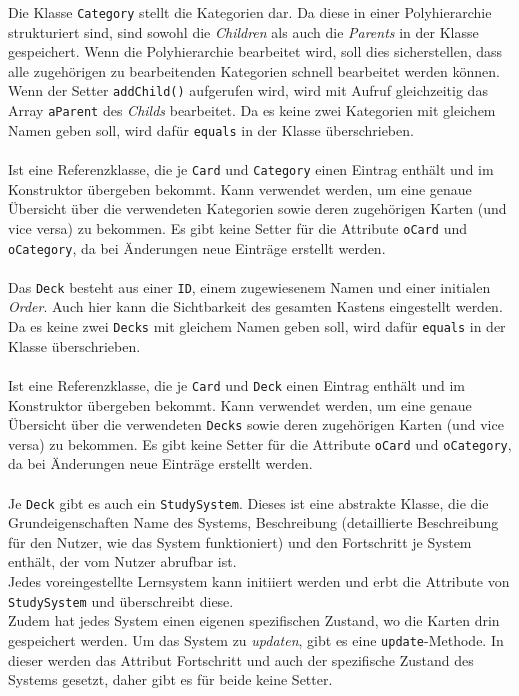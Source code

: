 \documentclass[fontsize=12pt,paper=a4,twoside]{scrartcl}
\begin{document}
\newpage
{}
Die Klasse \texttt{Category} stellt die Kategorien dar. Da diese in einer Polyhierarchie strukturiert sind, sind sowohl die \textit{Children} als auch die \textit{Parents} in der Klasse gespeichert. Wenn die Polyhierarchie bearbeitet wird, soll dies sicherstellen, dass alle zugehörigen zu bearbeitenden Kategorien schnell bearbeitet werden können. Wenn der Setter \texttt{addChild()} aufgerufen wird, wird mit Aufruf gleichzeitig das Array \texttt{aParent} des \textit{Childs} bearbeitet. Da es keine zwei Kategorien mit gleichem Namen geben soll, wird dafür \texttt{equals} in der Klasse überschrieben.\\
\\

Ist eine Referenzklasse, die je \texttt{Card} und \texttt{Category} einen Eintrag enthält und im Konstruktor übergeben bekommt. Kann verwendet werden, um eine genaue Übersicht über die verwendeten Kategorien sowie deren zugehörigen Karten (und vice versa) zu bekommen. Es gibt keine Setter für die Attribute \texttt{oCard} und \texttt{oCategory}, da bei Änderungen neue Einträge erstellt werden.\\
\\

Das \texttt{Deck} besteht aus einer \texttt{ID}, einem zugewiesenem Namen und einer initialen \textit{Order}. Auch hier kann die Sichtbarkeit des gesamten Kastens eingestellt werden. Da es keine zwei \texttt{Decks} mit gleichem Namen geben soll, wird dafür \texttt{equals} in der Klasse überschrieben. \\
\\

Ist eine Referenzklasse, die je \texttt{Card} und \texttt{Deck} einen Eintrag enthält und im Konstruktor übergeben bekommt. Kann verwendet werden, um eine genaue Übersicht über die verwendeten \texttt{Decks} sowie deren zugehörigen Karten (und vice versa) zu bekommen. Es gibt keine Setter für die Attribute \texttt{oCard} und \texttt{oCategory}, da bei Änderungen neue Einträge erstellt werden.\\
\\

\newpage
{}
Je \texttt{Deck} gibt es auch ein \texttt{StudySystem}. Dieses ist eine abstrakte Klasse, die die Grundeigenschaften Name des Systems, Beschreibung (detaillierte Beschreibung für den Nutzer, wie das System funktioniert) und den Fortschritt je System enthält, der vom Nutzer abrufbar ist. \\
Jedes voreingestellte Lernsystem kann initiiert werden und erbt die Attribute von \texttt{StudySystem} und überschreibt diese. \\
Zudem hat jedes System einen eigenen spezifischen Zustand, wo die Karten drin gespeichert werden. Um das System zu \textit{updaten}, gibt es eine \texttt{update}-Methode. In dieser werden das Attribut Fortschritt und auch der spezifische Zustand des Systems gesetzt, daher gibt es für beide keine Setter.\\
\\
\end{document}
